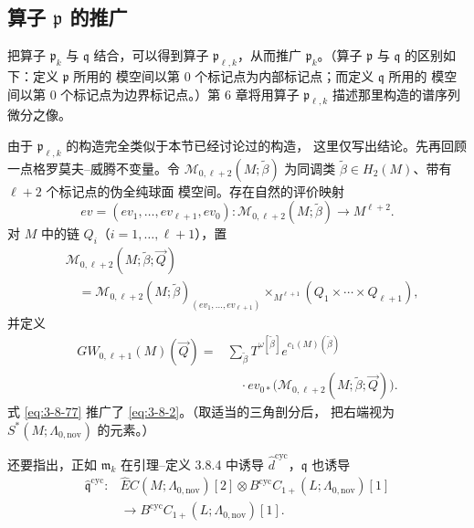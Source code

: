 
\subsection{算子 \texorpdfstring{$\mathfrak p$}{p} 的推广}
\label{subsec:3-8-9}

把算子 $\mathfrak p_k$ 与 $\mathfrak q$ 结合，可以得到算子
$\mathfrak p_{\ell,k}$，从而推广 $\mathfrak p_k$。（算子
$\mathfrak p$ 与 $\mathfrak q$ 的区别如下：定义 $\mathfrak p$ 所用的
模空间以第 $0$ 个标记点为内部标记点；而定义 $\mathfrak q$ 所用的
模空间以第 $0$ 个标记点为边界标记点。）第 6 章将用算子
$\mathfrak p_{\ell,k}$ 描述那里构造的谱序列微分之像。

由于 $\mathfrak p_{\ell,k}$ 的构造完全类似于本节已经讨论过的构造，
这里仅写出结论。先再回顾一点格罗莫夫--威腾不变量。令
$\mathcal M_{0,\ell+2}(M;\widetilde\beta)$ 为同调类
$\widetilde\beta\in H_2(M)$、带有 $\ell+2$ 个标记点的伪全纯球面
模空间。存在自然的评价映射
\[
 ev=(ev_1,\ldots,ev_{\ell+1},ev_0)\colon
 \mathcal M_{0,\ell+2}(M;\widetilde\beta)
 \longrightarrow M^{\ell+2}.
\]
对 $M$ 中的链 $Q_i$（$i=1,\ldots,\ell+1$），置
\[
\begin{aligned}
 &\mathcal M_{0,\ell+2}
 (M;\widetilde\beta;\vec Q)\\
 &\quad=
 \mathcal M_{0,\ell+2}(M;\widetilde\beta)
 _{(ev_1,\ldots,ev_{\ell+1})}
 \mathbin{\times_{M^{\ell+1}}}
 (Q_1\times\cdots\times Q_{\ell+1}),
\end{aligned}
\]
并定义
\begin{equation}
\begin{aligned}
 GW_{0,\ell+1}(M)(\vec Q)
 ={}&\sum_{\widetilde\beta}
 T^{\omega[\widetilde\beta]}
 e^{c_1(M)(\widetilde\beta)}\\
 &\quad\cdot ev_{0*}\bigl(
 \mathcal M_{0,\ell+2}
 (M;\widetilde\beta;\vec Q)
 \bigr).
\end{aligned}
\tag{3.8.77}\label{eq:3-8-77}
\end{equation}
式 \eqref{eq:3-8-77} 推广了 \eqref{eq:3-8-2}。（取适当的三角剖分后，
把右端视为 $S^*(M;\Lambda_{0,\mathrm{nov}})$ 的元素。）

还要指出，正如 $\mathfrak m_k$ 在引理--定义 3.8.4 中诱导
$\widehat d^{\mathrm{cyc}}$，$\mathfrak q$ 也诱导
\[
\begin{aligned}
 \widehat{\mathfrak q}^{\mathrm{cyc}}\colon{}&
 \widehat EC(M;\Lambda_{0,\mathrm{nov}})[2]
 \otimes
 B^{\mathrm{cyc}}C_{1+}(L;\Lambda_{0,\mathrm{nov}})[1]\\
 &\longrightarrow
 B^{\mathrm{cyc}}C_{1+}(L;\Lambda_{0,\mathrm{nov}})[1].
\end{aligned}
\]

